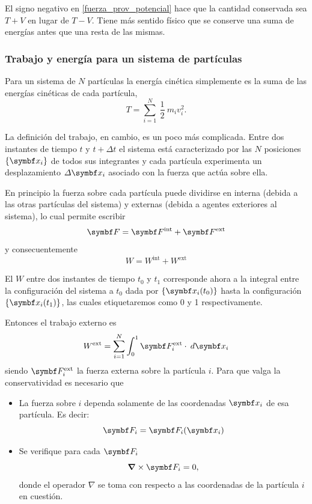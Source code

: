 \documentclass[10pt,oneside]{CBFT_book}
\begin{document}
El signo negativo en \eqref{fuerza_prov_potencial} hace que la cantidad conservada sea $T+V$ en lugar de $T-V$.
Tiene más sentido físico que se conserve una suma de energías antes que una resta de las mismas.

\subsubsection{Trabajo y energía para un sistema de partículas}

Para un sistema de $ N $ partículas la energía cinética simplemente es la suma de las energías cinéticas de cada 
partícula,
\[
	T = \sum_{i=1}^N \: \frac{1}{2} \: m_i v_i^2.
\]

La definición del trabajo, en cambio, es un poco más complicada. Entre dos instantes de tiempo $ t $ y $ t + \Delta t $ 
el sistema está caracterizado por las $ N $ posiciones $ \{\vb{x}_i\} $ de todos sus integrantes y cada partícula 
experimenta un desplazamiento $ \Delta \vb{x}_i $ asociado con la fuerza que actúa sobre ella.

En principio la fuerza sobre cada partícula puede dividirse en interna (debida a las otras partículas del sistema) y 
externas (debida a agentes exteriores al sistema), lo cual permite escribir
\[
	\vb{F} = \vb{F}^{\text{int}} + \vb{F}^{\text{ext}}
\]
y consecuentemente
\[
	W = W^{\text{int}} + W^{\text{ext}}
\]

El $ W $ entre dos instantes de tiempo $t_0$ y $t_1$ corresponde ahora a la integral entre la configuración del sistema 
a $t_0$ dada por $ \{\vb{x}_i(t_0)\} $ hasta la configuración $ \{\vb{x}_i(t_1)\} $, las cuales etiquetaremos como 0 y 
1 respectivamente. 

Entonces el trabajo externo es
\[
	W^{\text{ext}} = \sum_{i=1}^N \int_0^1 \vb{F}^{\text{ext}}_i \cdot \: d\vb{x}_i
\]
siendo $ \vb{F}^{\text{ext}}_i $ la fuerza externa sobre la partícula $i$. Para que valga la conservatividad es 
necesario que 
\begin{itemize}
 \item La fuerza sobre $i$ dependa solamente de las coordenadas $\vb{x}_i$ de esa partícula. Es decir:
 \[
	\vb{F}_i = \vb{F}_i(\vb{x}_i)
 \]
 \item Se verifique para cada $\vb{F}_i$ 
 \[
	\Nabla \times \vb{F}_i = 0,
 \]
 donde el operador $\nabla$ se toma con respecto a las coordenadas de la partícula $i$ en cuestión.
\end{itemize}
\end{document}

